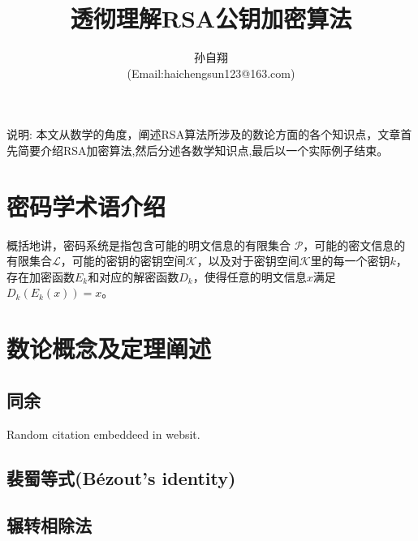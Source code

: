 \documentclass{article}
\title{\huge{透彻理解RSA公钥加密算法} }
\author{孙自翔\\[2pt]
(Email:haichengsun123@163.com) \\[2pt]}
\date{}  %
\begin{document}
\maketitle

\tableofcontents
{} %

\newpage



说明: 本文从数学的角度，阐述RSA算法所涉及的数论方面的各个知识点，文章首先简要介绍RSA加密算法,然后分述各数学知识点,最后以一个实际例子结束。
% 
\section{密码学术语介绍}
% 
\hspace*{6mm}
概括地讲\cite{BOOK:1}，密码系统是指包含可能的明文信息的有限集合 $\mathscr{P}$，可能的密文信息的有限集合$\mathscr{L}$，可能的密钥的密钥空间$\mathscr{K}$，以及对于密钥空间$\mathscr{K}$里的每一个密钥$k$，存在加密函数$E_k$和对应的解密函数$D_k$，使得任意的明文信息$x$满足$D_k(E_k(x))=x$。


\section{数论概念及定理阐述}
\subsection{同余}   

Random citation \cite{WEBSITE:1} embeddeed in websit.

\subsection{裴蜀等式(Bézout's identity)}   
\subsection{辗转相除法}   
\end{document}
